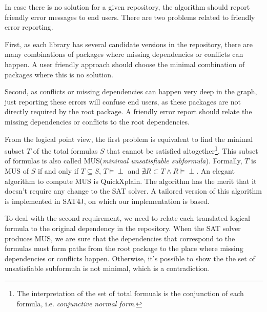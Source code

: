 In case there is no solution for a given repository, the algorithm should report friendly error messages to end users. There are two problems related to friendly error reporting.

First, as each library has several candidate versions in the repository, there are many combinations of packages where missing dependencies or conflicts can happen. A user friendly approach should choose the minimal combination of packages where this is no solution.

Second, as conflicts or missing dependencies can happen very deep in the graph, just reporting these errors will confuse end users, as these packages are not directly required by the root package. A friendly error report should relate the missing dependencies or conflicts to the root dependencies.

From the logical point view, the first problem is equivalent to find the minimal subset $T$ of the total formulas $S$ that cannot be satisfied altogether\footnote{The interpretation of the set of total formuals is the conjunction of each formula, i.e. \emph{conjunctive normal form}.}. This subset of formulas is also called MUS(\emph{minimal unsatisfiable subformula}). Formally, $T$ is MUS of $S$ if and only if $T \subseteq S$, $T \vDash \perp$ and $\nexists R \subset T \wedge R \vDash \perp$. An elegant algorithm to compute MUS is QuickXplain\cite{junker2004quickxplain}. The algorithm has the merit that it doesn't require any change to the SAT solver. A tailored version of this algorithm is implemented in SAT4J, on which our implementation is based.



To deal with the second requirement, we need to relate each translated logical formula to the original dependency in the repository. When the SAT solver produces MUS, we are sure that the dependencies that correspond to the formulas must form paths from the root package to the place where missing dependencies or conflicts happen. Otherwise, it's possible to show the the set of unsatisfiable subformula is not minimal, which is a contradiction.

